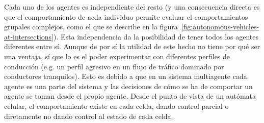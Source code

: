 Cada uno de los agentes es independiente del resto (y una consecuencia directa es que el comportamiento de acda individuo permite evaluar el comportamientos grupales complejos, como el que se describe en la figura~\ref{fig:autonomous-vehicles-at-intersections}). Esta independencia da la posibilidad de tener todos los agentes diferentes entre sí. Aunque de por sí la utilidad de este hecho no tiene por qué ser una ventaja, sí que lo es el poder experimentar con diferentes perfiles de conducción (e.g. un perfil agresivo en un flujo de tráfico dominado por conductores tranquilos). Esto es debido a que en un sistema multiagente cada agente es una parte del sistema y las decisiones de cómo se ha de comportar un agente se toman desde el propio agente. Desde el punto de vista de un autómata celular, el comportamiento existe en cada celda, dando control parcial o diretamente no dando control al estado de cada celda.

